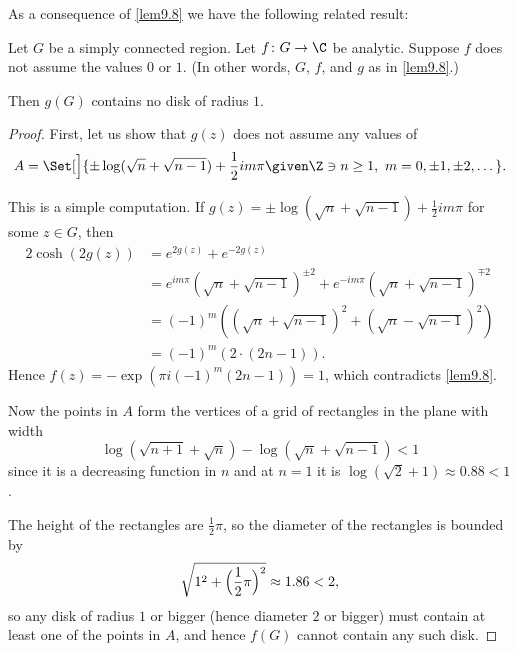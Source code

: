 


As a consequence of \autoref{lem9.8} we have the following related result:

\begin{lemma}\label{lem9.9}
	Let $G$ be a simply connected region.
	Let $f \colon G \to \C$ be analytic.
	Suppose $f$ does not assume the values $0$ or $1$.
	(In other words, $G$, $f$, and $g$ as in \autoref{lem9.8}.)

	Then $g(G)$ contains no disk of radius $1$.
\end{lemma}

\begin{proof}
	First, let us show that $g(z)$ does not assume any values of
	\[
		A = \Set[\Big]{\pm \log(\sqrt{n} + \sqrt{n - 1}) + \frac{1}{2} i m \pi \given \Z \ni n \geq 1,\ m = 0, \pm 1, \pm 2, \dots}.
	\]

	This is a simple computation.
	If $g(z) = \pm \log(\sqrt{n} + \sqrt{n - 1}) + \frac{1}{2} i m \pi$ for some $z \in G$, then
	\begin{align*}
		2 \cosh(2 g(z)) &= e^{2 g(z)} + e^{- 2g(z)} \\
		&= e^{i m \pi} (\sqrt{n} + \sqrt{n - 1})^{\pm 2} + e^{- i m \pi} (\sqrt{n} + \sqrt{n - 1})^{\mp 2} \\
		&= (-1)^m \left ( (\sqrt{n} + \sqrt{n - 1})^2 + (\sqrt{n} - \sqrt{n - 1})^2 \right ) \\
		&= (-1)^m (2 \cdot (2 n - 1)).
	\end{align*}
	Hence $f(z) = -\exp(\pi i (-1)^m (2 n - 1)) = 1$, which contradicts \autoref{lem9.8}.

	Now the points in $A$ form the vertices of a grid of rectangles in the plane with width
	\[
		\log(\sqrt{n + 1} + \sqrt{n}) - \log(\sqrt{n} + \sqrt{n - 1}) < 1
	\]
	since it is a decreasing function in $n$ and at $n = 1$ it is $\log(\sqrt{2} + 1) \approx 0.88 < 1$.

	The height of the rectangles are $\frac{1}{2} \pi$, so the diameter of the rectangles is bounded by
	\[
		\sqrt{1^2 + \Bigl( \frac{1}{2} \pi \Bigr)^2} \approx 1.86 < 2,
	\]
	so any disk of radius $1$ or bigger (hence diameter $2$ or bigger) must contain at least one of the points in $A$, and hence $f(G)$ cannot contain any such disk.
\end{proof}
